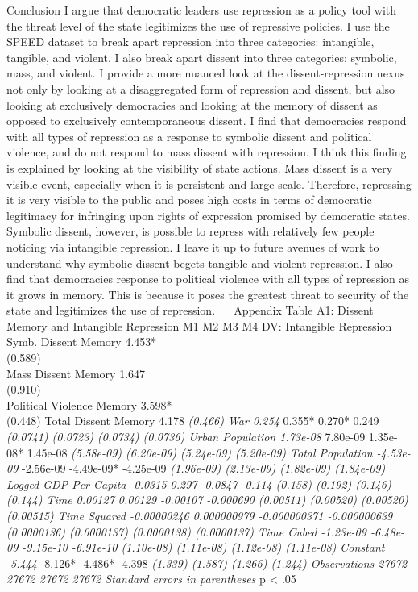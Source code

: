 \documentclass[ignorenonframetext,]{beamer}
\begin{document}
\begin{frame}[fragile]
Conclusion I argue that democratic leaders use repression as a policy
tool with the threat level of the state legitimizes the use of
repressive policies. I use the SPEED dataset to break apart repression
into three categories: intangible, tangible, and violent. I also break
apart dissent into three categories: symbolic, mass, and violent. I
provide a more nuanced look at the dissent-repression nexus not only by
looking at a disaggregated form of repression and dissent, but also
looking at exclusively democracies and looking at the memory of dissent
as opposed to exclusively contemporaneous dissent. I find that
democracies respond with all types of repression as a response to
symbolic dissent and political violence, and do not respond to mass
dissent with repression. I think this finding is explained by looking at
the visibility of state actions. Mass dissent is a very visible event,
especially when it is persistent and large-scale. Therefore, repressing
it is very visible to the public and poses high costs in terms of
democratic legitimacy for infringing upon rights of expression promised
by democratic states. Symbolic dissent, however, is possible to repress
with relatively few people noticing via intangible repression. I leave
it up to future avenues of work to understand why symbolic dissent
begets tangible and violent repression. I also find that democracies
response to political violence with all types of repression as it grows
in memory. This is because it poses the greatest threat to security of
the state and legitimizes the use of repression.   Appendix Table A1:
Dissent Memory and Intangible Repression M1 M2 M3 M4 DV: Intangible
Repression Symb. Dissent Memory 4.453*\\
(0.589)\\
Mass Dissent Memory 1.647\\
(0.910)\\
Political Violence Memory 3.598*\\
(0.448) Total Dissent Memory 4.178\emph{ (0.466) War 0.254} 0.355*
0.270* 0.249\emph{ (0.0741) (0.0723) (0.0734) (0.0736) Urban Population
1.73e-08} 7.80e-09 1.35e-08* 1.45e-08\emph{ (5.58e-09) (6.20e-09)
(5.24e-09) (5.20e-09) Total Population -4.53e-09} -2.56e-09 -4.49e-09*
-4.25e-09\emph{ (1.96e-09) (2.13e-09) (1.82e-09) (1.84e-09) Logged GDP
Per Capita -0.0315 0.297 -0.0847 -0.114 (0.158) (0.192) (0.146) (0.144)
Time 0.00127 0.00129 -0.00107 -0.000690 (0.00511) (0.00520) (0.00520)
(0.00515) Time Squared -0.00000246 0.000000979 -0.000000371 -0.000000639
(0.0000136) (0.0000137) (0.0000138) (0.0000137) Time Cubed -1.23e-09
-6.48e-09 -9.15e-10 -6.91e-10 (1.10e-08) (1.11e-08) (1.12e-08)
(1.11e-08) Constant -5.444} -8.126* -4.486* -4.398\emph{ (1.339) (1.587)
(1.266) (1.244) Observations 27672 27672 27672 27672 Standard errors in
parentheses } p \textless{} .05


\end{frame}
\end{document}

